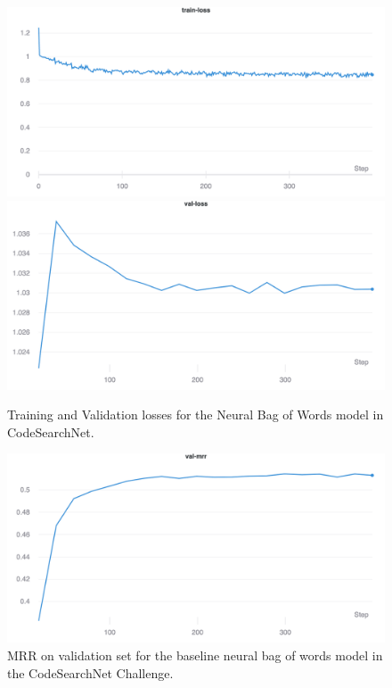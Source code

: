 \documentclass[10pt,twocolumn]{article}
\begin{document}
\begin{figure}[!ht]
    \centering
    \includegraphics[scale=0.1]{figures/neuralbow/train-loss.png}
    \includegraphics[scale=0.1]{figures/neuralbow/val-loss.png}
    \caption{Training and Validation losses for the Neural Bag of Words model in CodeSearchNet.}
    \label{fig:train_valid_neural_bow_model}
\end{figure}

\begin{figure}[!ht]
    \centering
    \includegraphics[scale=0.15]{figures/neuralbow/val-mrr.png}
    \caption{MRR on validation set for the baseline neural bag of words model in the CodeSearchNet Challenge.}
    \label{fig:val_mrr_neuralbow}
\end{figure}
\end{document}
